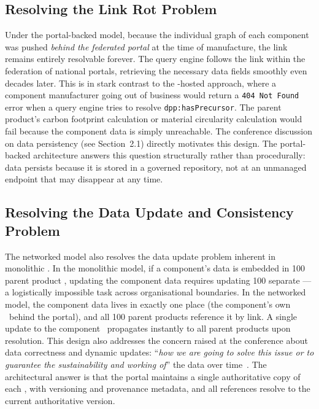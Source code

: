 \subsection{Resolving the Link Rot Problem}

Under the portal-backed model, because the individual graph of each component
was pushed \textit{behind the federated portal} at the time of manufacture, the
link remains entirely resolvable forever. The query engine follows the link
within the federation of national portals, retrieving the necessary data fields
smoothly even decades later. This is in stark contrast to the \REO-hosted
approach, where a component manufacturer going out of business would return a
\texttt{404 Not Found} error when a query engine tries to resolve
\texttt{dpp:hasPrecursor}. The parent product's carbon footprint calculation or
material circularity calculation would fail because the component data is simply
unreachable. The conference discussion on data persistency (see Section~2.1)
directly motivates this design. The portal-backed architecture answers this
question structurally rather than procedurally: data persists because it is
stored in a governed repository, not at an unmanaged endpoint that may disappear
at any time.

\subsection{Resolving the Data Update and Consistency Problem}

The networked model also resolves the data update problem inherent in monolithic
\DPPs. In the monolithic model, if a component's data is embedded in 100 parent
product \DPPs, updating the component data requires updating 100 separate \DPPs
--- a logistically impossible task across organisational boundaries. In the
networked model, the component data lives in exactly one place (the component's
own \DPP\ behind the portal), and all 100 parent products reference it by link.
A single update to the component \DPP\ propagates instantly to all parent
products upon resolution. This design also addresses the concern raised at the
conference about data correctness and dynamic updates: ``\textit{how we are
going to solve this issue or to guarantee the sustainability and working of}''
the data over time~\cite{dpp4eu2026_day2}. The architectural answer is that the
portal maintains a single authoritative copy of each \DPP, with versioning and
provenance metadata, and all references resolve to the current authoritative
version.
